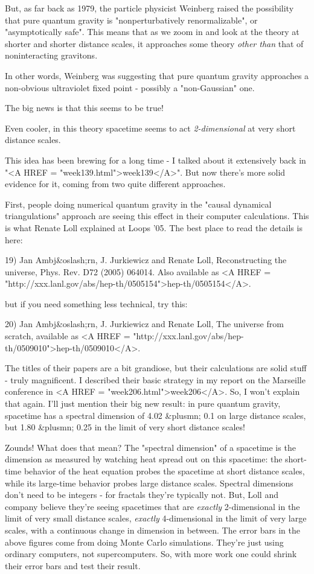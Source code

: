 But, as far back as 1979, the particle physicist Weinberg raised the 
possibility that pure quantum gravity is "nonperturbatively 
renormalizable", or "asymptotically safe".  This means that 
as we 
zoom in and look at the theory at shorter and shorter distance scales, 
it approaches some theory \emph{other than} that of noninteracting gravitons.

In other words, Weinberg was suggesting that pure quantum gravity 
approaches a non-obvious ultraviolet fixed point - possibly a 
"non-Gaussian" one.  

The big news is that this seems to be true!  

Even cooler, in this theory spacetime seems to act \emph{2-dimensional}
at very short distance scales.  

This idea has been brewing for a long time - I talked about it 
extensively back in "<A HREF = "week139.html">week139</A>".  
But now there's more solid 
evidence for it, coming from two quite different approaches.

First, people doing numerical quantum gravity in the "causal dynamical 
triangulations" approach are seeing this effect in their computer 
calculations.  This is what Renate Loll explained at Loops '05.  The 
best place to read the details is here:

19) Jan Ambj&oslash;rn, J. Jurkiewicz and Renate Loll, Reconstructing 
the universe, Phys. Rev. D72 (2005) 064014.  Also available as
<A HREF = "http://xxx.lanl.gov/abs/hep-th/0505154">hep-th/0505154</A>.

but if you need something less technical, try this:

20) Jan Ambj&oslash;rn, J. Jurkiewicz and Renate Loll, The universe from
scratch, available as 
<A HREF = "http://xxx.lanl.gov/abs/hep-th/0509010">hep-th/0509010</A>.

The titles of their papers are a bit grandiose, but their calculations 
are solid stuff - truly magnificent.  I described their basic strategy
in my report on the Marseille conference in 
<A HREF = "week206.html">week206</A>.  So, I won't explain that again.
I'll just mention their big new result: in pure 
quantum gravity, spacetime has a spectral dimension of 4.02 
&plusmn; 0.1 on large distance scales, but 1.80 &plusmn; 0.25 in the 
limit of very short distance scales! 

Zounds!  What does that mean?
The "spectral dimension" of a spacetime is the dimension as measured 
by watching heat spread out on this spacetime: the short-time behavior of 
the heat equation probes the spacetime at short distance scales, while its 
large-time behavior probes large distance scales.  Spectral dimensions
don't need to be integers - for fractals they're typically not.  But,
Loll and company believe they're seeing spacetimes that are \emph{exactly}
2-dimensional in the limit of very small distance scales, 
\emph{exactly} 4-dimensional in the limit of very large scales, 
with a continuous change in dimension in between.   The error bars in 
the above figures come from doing Monte Carlo simulations.  They're 
just using ordinary computers, not supercomputers.  So, with 
more work one could shrink their error bars and test their result.

